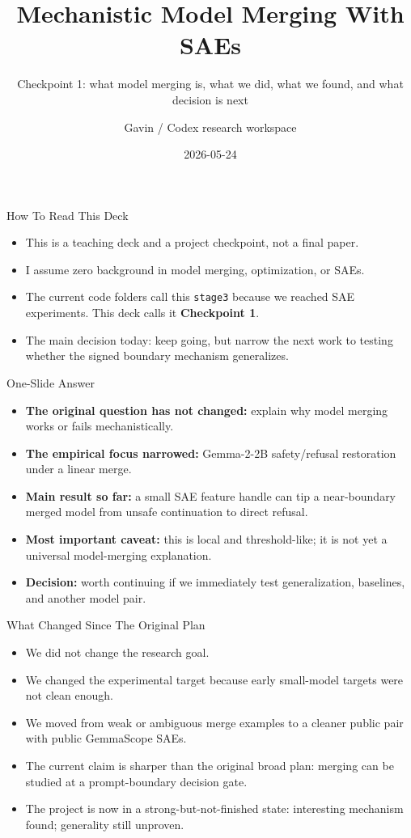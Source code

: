 \documentclass[aspectratio=169]{beamer}
\begin{document}
\title{Mechanistic Model Merging With SAEs}
\subtitle{Checkpoint 1: what model merging is, what we did, what we found, and what decision is next}
\author{Gavin / Codex research workspace}
\date{2026-05-24}

\begin{frame}
  \titlepage
\end{frame}

\begin{frame}{How To Read This Deck}
\small
\begin{itemize}
  \item This is a teaching deck and a project checkpoint, not a final paper.
  \item I assume zero background in model merging, optimization, or SAEs.
  \item The current code folders call this \texttt{stage3} because we reached SAE experiments. This deck calls it \textbf{Checkpoint 1}.
  \item The main decision today: keep going, but narrow the next work to testing whether the signed boundary mechanism generalizes.
\end{itemize}
\end{frame}

\begin{frame}{One-Slide Answer}
\small
\begin{itemize}
  \item \textbf{The original question has not changed:} explain why model merging works or fails mechanistically.
  \item \textbf{The empirical focus narrowed:} Gemma-2-2B safety/refusal restoration under a linear merge.
  \item \textbf{Main result so far:} a small SAE feature handle can tip a near-boundary merged model from unsafe continuation to direct refusal.
  \item \textbf{Most important caveat:} this is local and threshold-like; it is not yet a universal model-merging explanation.
  \item \textbf{Decision:} worth continuing if we immediately test generalization, baselines, and another model pair.
\end{itemize}
\end{frame}

\begin{frame}{What Changed Since The Original Plan}
\small
\begin{itemize}
  \item We did not change the research goal.
  \item We changed the experimental target because early small-model targets were not clean enough.
  \item We moved from weak or ambiguous merge examples to a cleaner public pair with public GemmaScope SAEs.
  \item The current claim is sharper than the original broad plan: merging can be studied at a prompt-boundary decision gate.
  \item The project is now in a strong-but-not-finished state: interesting mechanism found; generality still unproven.
\end{itemize}
\end{frame}
\end{document}
